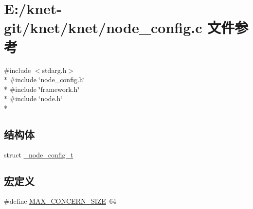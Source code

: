 \hypertarget{a00104}{}\section{E\+:/knet-\/git/knet/knet/node\+\_\+config.c 文件参考}
\label{a00104}
{\ttfamily \#include $<$stdarg.\+h$>$}\\*
{\ttfamily \#include \char`\"{}node\+\_\+config.\+h\char`\"{}}\\*
{\ttfamily \#include \char`\"{}framework.\+h\char`\"{}}\\*
{\ttfamily \#include \char`\"{}node.\+h\char`\"{}}\\*
\subsection*{结构体}
\begin{DoxyCompactItemize}
\item 
struct \hyperlink{a00034}{\+\_\+node\+\_\+config\+\_\+t}
\end{DoxyCompactItemize}
\subsection*{宏定义}
\begin{DoxyCompactItemize}
\item 
\#define \hyperlink{a00104_af589e30e64a38f5efe59caad930a3f52_af589e30e64a38f5efe59caad930a3f52}{M\+A\+X\+\_\+\+C\+O\+N\+C\+E\+R\+N\+\_\+\+S\+I\+Z\+E}~64
\end{DoxyCompactItemize}
